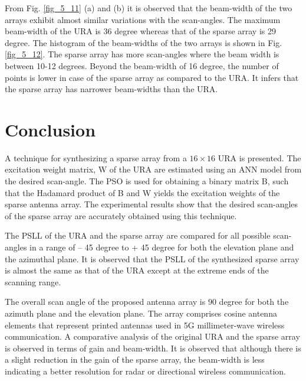 From Fig. \ref{fig_5_11} (a) and (b) it is observed that the beam-width of the two arrays exhibit almost similar variations with the scan-angles. The maximum beam-width of the URA is 36 degree whereas that of the sparse array is 29 degree. The histogram of the beam-widths of the two arrays is shown in Fig. \ref{fig_5_12}. The sparse array has more scan-angles where the beam width is between 10-12 degrees. Beyond the beam-width of 16 degree, the number of points is lower in case of the sparse array as compared to the URA. It infers that the sparse array has narrower beam-widths than the URA.

\section{Conclusion}
A technique for synthesizing a sparse array from a $16\times 16$ URA is presented. The excitation weight matrix, W of the URA are estimated using an ANN model from the desired scan-angle. The PSO is used for obtaining a binary matrix B, such that the Hadamard product of B and W yields the excitation weights of the sparse antenna array. The experimental results show that the desired scan-angles of the sparse array are accurately obtained using this technique.

The PSLL of the URA and the sparse array are compared for all possible scan-angles in a range of -- 45 degree to + 45 degree for both the elevation plane and the azimuthal plane. It is observed that the PSLL of the synthesized sparse array is almost the same as that of the URA except at the extreme ends of the scanning range.

The overall scan angle of the proposed antenna array is 90 degree for both the azimuth plane and the elevation plane. The array comprises cosine antenna elements that represent printed antennas used in 5G millimeter-wave wireless communication. A comparative analysis of the original URA and the sparse array is observed in terms of gain and beam-width. It is observed that although there is a slight reduction in the gain of the sparse array, the beam-width is less indicating a better resolution for radar or directional wireless communication.
